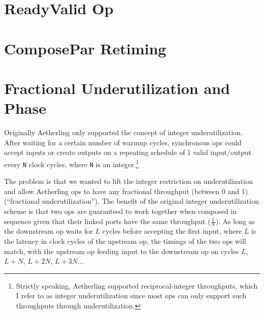\documentclass[12pt]{article}
\begin{document}
\section{ReadyValid Op}

\section{ComposePar Retiming}

\section{Fractional Underutilization and Phase}


Originally Aetherling only supported the concept of integer
underutilization. After waiting for a certain number of warmup cycles,
synchronous ops could accept inputs or create outputs on a repeating
schedule of 1 valid input/output every \texttt{N} clock cycles, where
\texttt{N} is an integer.\footnote{Strictly speaking, Aetherling
  supported reciprocal-integer throughputs, which I refer to as
  integer underutilization since most ops can only support such
  throughputs through underutilization.}

The problem is that we wanted to lift the integer restriction on
underutilization and allow Aetherling ops to have any fractional
throughput (between 0 and 1) (``fractional underutilization''). The
benefit of the original integer underutilization scheme is that two
ops are guaranteed to work together when composed in sequence given
that their linked ports have the same throughput ($\frac{1}{N}$). As
long as the downstream op waits for $L$ cycles before accepting the
first input, where $L$ is the latency in clock cycles of the upstream
op, the timings of the two ops will match, with the upstream op
feeding input to the downstream op on cycles $L$, $L+N$, $L+2N$,
$L+3N$...
\end{document}
